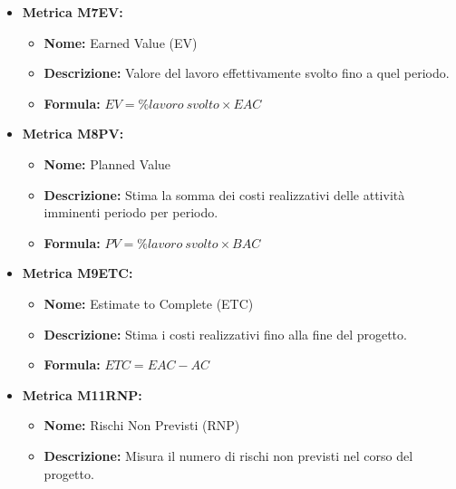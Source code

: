 \begin{itemize}
    \item \textbf{Metrica M7EV:}
          \begin{itemize}
              \item \textbf{Nome:} Earned Value (EV)
              \item \textbf{Descrizione:} Valore del lavoro effettivamente svolto fino a quel periodo.
              \item \textbf{Formula:} $EV = \% lavoro \ svolto \times EAC$
          \end{itemize}

    \item \textbf{Metrica M8PV:}
          \begin{itemize}
              \item \textbf{Nome:} Planned Value
              \item \textbf{Descrizione:} Stima la somma dei costi realizzativi delle attività imminenti periodo per periodo.
              \item \textbf{Formula:} $PV = \% lavoro \ svolto \times BAC$
          \end{itemize}

    \item \textbf{Metrica M9ETC:}
          \begin{itemize}
              \item \textbf{Nome:} Estimate to Complete (ETC)
              \item \textbf{Descrizione:} Stima i costi realizzativi fino alla fine del progetto.
              \item \textbf{Formula:} $ETC = EAC - AC$
          \end{itemize}

    \item \textbf{Metrica M11RNP:}
          \begin{itemize}
              \item \textbf{Nome:} Rischi Non Previsti (RNP)
              \item \textbf{Descrizione:} Misura il numero di rischi non previsti nel corso del progetto.
          \end{itemize}


\end{itemize}
